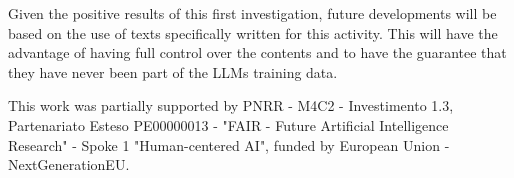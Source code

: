 \documentclass[
twocolumn,
]{ceurart}
\begin{document}
Given the positive results of this first investigation, future developments will be based on the use of texts specifically written for this activity. This will have the advantage of having full control over the contents and to have the guarantee that they have never been part of the LLMs training data.

\FloatBarrier


\begin{acknowledgments}
This work was partially supported by PNRR - M4C2 - Investimento 1.3, Partenariato Esteso PE00000013 - "FAIR - Future Artificial Intelligence Research" - Spoke 1 "Human-centered AI", funded by European Union - NextGenerationEU.
\end{acknowledgments}




\end{document}
